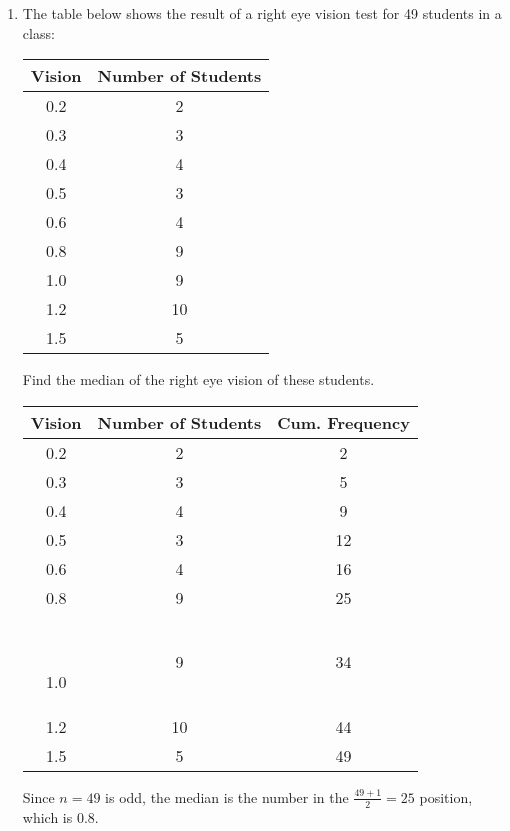 \documentclass{report}
\begin{document}
\begin{multicols}{2}
\begin{enumerate}
    \item The table below shows the result of a right eye vision test for 49 students in
          a class:
          \begin{center}
            \begin{tabular}{|c|c|}
              \hline
              Vision & Number of Students \\
              \hline
              0.2    & 2                  \\
              0.3    & 3                  \\
              0.4    & 4                  \\
              0.5    & 3                  \\
              0.6    & 4                  \\
              0.8    & 9                  \\
              1.0    & 9                  \\
              1.2    & 10                 \\
              1.5    & 5                  \\
              \hline
            \end{tabular}
          \end{center}
          Find the median of the right eye vision of these students.
          \sol{}
          \begin{center}
            \begin{tabular}{|c|c|c|}
              \hline
              Vision & Number of Students & Cum. Frequency \\
              \hline
              0.2    & 2                  & 2              \\
              0.3    & 3                  & 5              \\
              0.4    & 4                  & 9              \\
              0.5    & 3                  & 12             \\
              0.6    & 4                  & 16             \\
              0.8    & 9                  & 25             \\\

              1.0    & 9                  & 34             \\
              1.2    & 10                 & 44             \\
              1.5    & 5                  & 49             \\
              \hline
            \end{tabular}
          \end{center}
          Since $n = 49$ is odd, the median is the number in the $\frac{49 + 1}{2} = 25$ position, which is $0.8$.


\end{enumerate}
\end{multicols}
\end{document}
